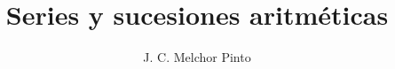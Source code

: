 \documentclass[12pt]{guia}
\title{Series y sucesiones aritméticas}
\author{J. C. Melchor Pinto}
\begin{document}
\pagestyle{headandfoot}
\addpoints
\INFO
\printanswers
\begin{questions}
    
    
    
    
    
    
    
    \begin{multicols}{2}
        
        
    \end{multicols}
    
    
    
    
\end{questions}

\end{document}
